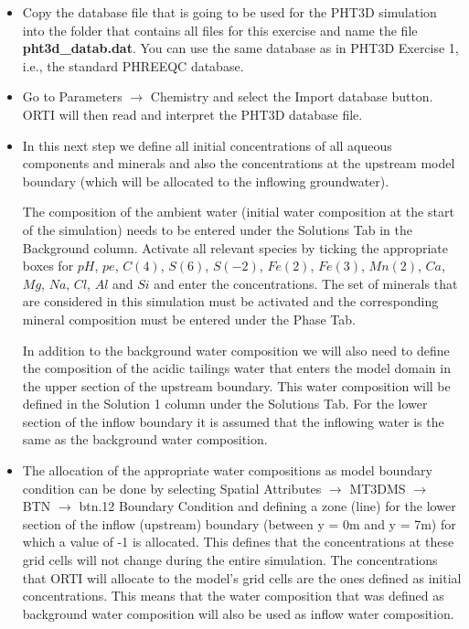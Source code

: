 \begin{itemize}

\item Copy the database file that is going to be used for the PHT3D simulation
into the folder that contains all files for this exercise and name the file {\color{red} \textbf{pht3d\_datab.dat}}.
You can use the same database as in PHT3D Exercise 1, i.e., the standard PHREEQC database.

\item Go to {\color{blue}Parameters} $\rightarrow$ {\color{blue}Chemistry} and select the
{\color{blue}Import database} button. ORTI will then read and interpret 
the PHT3D database file.

\item In this next step we define all initial concentrations of all aqueous components and minerals and 
also the concentrations at the upstream model boundary (which will be allocated to the inflowing groundwater).

The composition of the ambient water (initial water composition at the start of the simulation) 
needs to be entered under the {\color{blue}Solutions} Tab in the {\color{blue}Background} column.
Activate all relevant species by ticking the appropriate boxes for 
$pH$, $pe$, $C(4)$, $S(6)$, $S(-2)$, $Fe(2)$, $Fe(3)$, $Mn(2)$, $Ca$, $Mg$, $Na$, $Cl$, $Al$ and $Si$
and enter the concentrations. The set of minerals that are considered in this simulation
must be activated and the corresponding mineral composition must be entered 
under the {\color{blue}Phase} Tab.

In addition to the background water composition we will also need to define the composition of the 
acidic tailings water that enters the model domain in the upper section of the upstream boundary. 
This water composition will be defined in the {\color{blue}Solution 1} column 
under the {\color{blue}Solutions} Tab.
For the lower section of the inflow boundary it is assumed that the inflowing water
is the same as the background water composition.   

\item The allocation of the appropriate water compositions as model boundary condition can be
done by selecting {\color{blue}Spatial Attributes} $\rightarrow$ {\color{blue}MT3DMS} $\rightarrow$ {\color{blue}BTN} $\rightarrow$ {\color{blue}btn.12 Boundary Condition} and defining a zone (line)
for the lower section of the inflow (upstream) boundary (between y = 0m and y = 7m)
for which a value of -1 is allocated. This defines that the concentrations at these grid cells 
will not change during the entire simulation.   
The concentrations that ORTI will allocate to the model's grid cells are the ones defined 
as initial concentrations. This means that the water composition that was defined as background
water composition will also be used as inflow water composition. 


\end{itemize}
